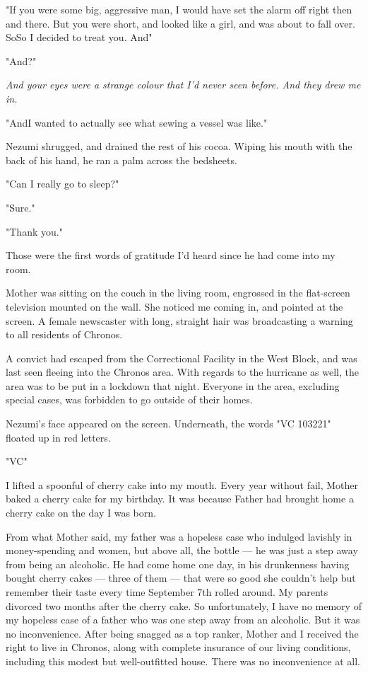 "If you were some big, aggressive man, I would have set the alarm off
right then and there. But you were short, and looked like a girl, and
was about to fall over. So\el So I decided to treat you. And\el "

"And?"

\emph{And your eyes were a strange colour that I'd never seen before. And they
drew me in.}

"And\el I wanted to actually see what sewing a vessel was like."

Nezumi shrugged, and drained the rest of his cocoa. Wiping his mouth
with the back of his hand, he ran a palm across the bedsheets.

"Can I really go to sleep?"

"Sure."

"Thank you."

Those were the first words of gratitude I'd heard since he had come into
my room.

\mybreak

Mother was sitting on the couch in the living room, engrossed in the
flat-screen television mounted on the wall. She noticed me coming in,
and pointed at the screen. A female newscaster with long, straight hair
was broadcasting a warning to all residents of Chronos.

A convict had escaped from the Correctional Facility in the West Block,
and was last seen fleeing into the Chronos area. With regards to the
hurricane as well, the area was to be put in a lockdown that night.
Everyone in the area, excluding special cases, was forbidden to go
outside of their homes.

Nezumi's face appeared on the screen. Underneath, the words "VC 103221"
floated up in red letters.

"VC\el "

I lifted a spoonful of cherry cake into my mouth. Every year without
fail, Mother baked a cherry cake for my birthday. It was because Father
had brought home a cherry cake on the day I was born.

From what Mother said, my father was a hopeless case who indulged
lavishly in money-spending and women, but above all, the bottle --- he was
just a step away from being an alcoholic. He had come home one day, in
his drunkenness having bought cherry cakes --- three of them --- that were
so good she couldn't help but remember their taste every time September
7th rolled around. My parents divorced two months after the cherry cake.
So unfortunately, I have no memory of my hopeless case of a father who
was one step away from an alcoholic. But it was no inconvenience. After
being snagged as a top ranker, Mother and I received the right to live
in Chronos, along with complete insurance of our living conditions,
including this modest but well-outfitted house. There was no
inconvenience at all.

